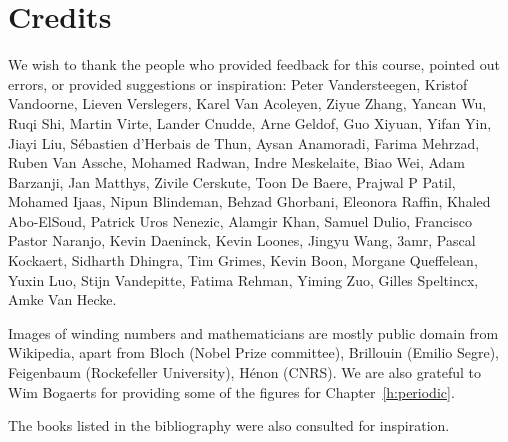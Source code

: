 \chapter{Credits}
\label{h:credits}

We wish to thank the people who provided feedback for this course, pointed out errors, or provided suggestions or inspiration: Peter Vandersteegen, Kristof Vandoorne, Lieven Verslegers, Karel Van Acoleyen, Ziyue Zhang, Yancan Wu, Ruqi Shi, Martin Virte, Lander Cnudde, Arne Geldof, Guo Xiyuan, Yifan Yin, Jiayi Liu, S\'ebastien d’Herbais de Thun, Aysan Anamoradi, Farima Mehrzad, Ruben Van Assche, Mohamed Radwan, Indre Meskelaite, Biao Wei, Adam Barzanji, Jan Matthys, Zivile Cerskute, Toon De Baere, Prajwal P Patil, Mohamed Ijaas, Nipun Blindeman, Behzad Ghorbani, Eleonora Raffin, Khaled Abo-ElSoud, Patrick Uros Nenezic, Alamgir Khan, Samuel Dulio, Francisco Pastor Naranjo, Kevin Daeninck, Kevin Loones, Jingyu Wang, 3amr, Pascal Kockaert, Sidharth Dhingra, Tim Grimes, Kevin Boon, Morgane Queffelean, Yuxin Luo, Stijn Vandepitte, Fatima Rehman, Yiming Zuo, Gilles Speltincx, Amke Van Hecke.

Images of winding numbers and mathematicians are mostly public domain from Wikipedia, apart from Bloch (Nobel Prize committee), Brillouin (Emilio Segre), Feigenbaum (Rockefeller University), H\'{e}non (CNRS). We are also grateful to Wim Bogaerts for providing some of the figures for Chapter~\ref{h:periodic}.

The books listed in the bibliography were also consulted for inspiration.


